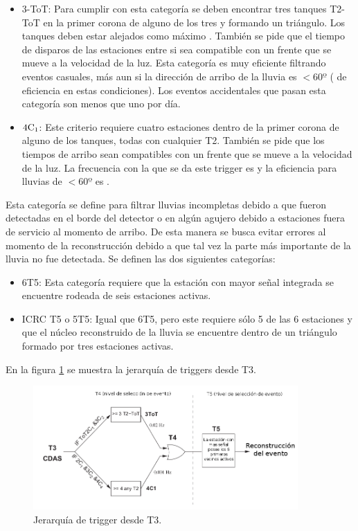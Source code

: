 			\begin{itemize}
			\item 3-ToT: Para cumplir con esta categor\'ia se deben encontrar tres tanques T2-ToT en la primer corona de alguno de los tres y formando un tri\'angulo. Los tanques deben estar alejados como m\'aximo . Tambi\'en se pide que el tiempo de disparos de las estaciones entre si sea compatible con un frente que se mueve a la velocidad de la luz. Esta categor\'ia es muy eficiente filtrando eventos casuales, m\'as aun si la direcci\'on de arribo de la lluvia es $<60º$ ( de eficiencia en estas condiciones). Los eventos accidentales que pasan esta categor\'ia son menos que uno por d\'ia.
			\item $\rm 4C_1$: Este criterio requiere cuatro estaciones dentro de la primer corona de alguno de los tanques, todas con cualquier T2. Tambi\'en se pide que los tiempos de arribo sean compatibles con un frente que se mueve a la velocidad de la luz. La frecuencia con la que se da este trigger es  y la eficiencia para lluvias de $<60º$ es .
			\end{itemize}
			\vspace{0.5cm}
			
			 Esta categor\'ia se define para filtrar lluvias incompletas debido a que fueron detectadas en el borde del detector o en alg\'un agujero debido a estaciones fuera de servicio al momento de arribo.
			De esta manera se busca evitar errores al momento de la reconstrucci\'on debido a que tal vez la parte m\'as importante de la lluvia no fue detectada.
			Se definen las dos siguientes categor\'ias:
			
			\begin{itemize}
			\item 6T5: Esta categor\'ia requiere que la estaci\'on con mayor se\~nal integrada se encuentre rodeada de seis estaciones activas.
			\item ICRC T5 o 5T5: Igual que 6T5, pero este requiere s\'olo 5 de las 6 estaciones y que el n\'ucleo reconstruido de la lluvia se encuentre dentro de un tri\'angulo formado por tres estaciones activas.
			\end{itemize}
			
			En la figura \ref{fig:diagtrig2} se muestra la jerarqu\'ia de triggers desde T3.
			
			\begin{figure}[h!]
				\begin{center}
				\includegraphics[width=0.9\textwidth]{fig/detectorAuger/Trigger_3}
				\caption{\label{fig:diagtrig2} Jerarqu\'ia de trigger desde T3.}
				\end{center}
			\end{figure}
